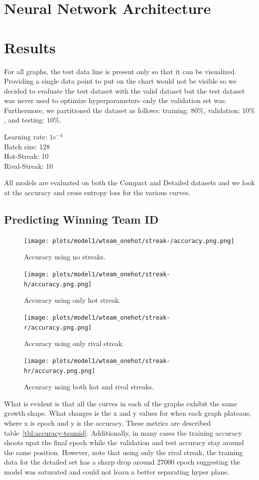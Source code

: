 \documentclass{article} %
\begin{document}
\begin{enumerate}
\section{Neural Network Architecture}
\label{sec:nn-architecture}


\section{Results}
\label{sec:results}

For all graphs, the test data line is present only so that it can be visualized.  Providing a single data point to put on the chart would not be visible so we decided to evaluate the test dataset with the valid dataset but the test dataset was never used to optimize hyperparameters--only the validation set was.  Furthermore, we partitioned the dataset as follows: training: $80\%$, validation: $10\%$, and testing: $10\%$.


Learning rate: $1e^{-4}$\\
Batch size: 128\\
Hot-Streak: 10\\
Rival-Streak: 10


All models are evaluated on both the Compact and Detailed datasets and we look at the accuracy and cross entropy loss for the various curves.
\subsection{Predicting Winning Team ID}
\label{sec:results-wteamid}


\begin{figure}[!htb]
  \texttt{[image: plots/model1/wteam\_onehot/streak-/accuracy.png.png]}
  \caption{Accuracy using no streaks.}\label{fig:wteam-onehot--accuracy}
\endminipage\hfill
{}
  \texttt{[image: plots/model1/wteam\_onehot/streak-h/accuracy.png.png]}
  \caption{Accuracy using only hot streak.}\label{fig:wteam-onehot-h-accuracy}
\endminipage\hfill
{}%
  \texttt{[image: plots/model1/wteam\_onehot/streak-r/accuracy.png.png]}
  \caption{Accuracy using only rival streak.}\label{fig:wteam-onehot-r-accuracy}
\endminipage
{}%
  \texttt{[image: plots/model1/wteam\_onehot/streak-hr/accuracy.png.png]}
  \caption{Accuracy using both hot and rival streaks.}\label{fig:wteam-onehot-hr-accuracy}
\endminipage
\end{figure}

What is evident is that all the curves in each of the graphs exhibit the same growth shape.  What changes is the x and y values for when each graph plateaus, where x is epoch and y is the accuracy.  These metrics are described table~\ref{tbl:accuracy-teamid}.  Additionally, in many cases the training accuracy shoots upat the final epoch while the validation and test accuracy stay around the same position.  However, note that using only the rival streak, the training data for the detailed set has a sharp drop around 27000 epoch suggesting the model was saturated and could not learn a better separating hyper plane.



\end{enumerate}
\end{document}
